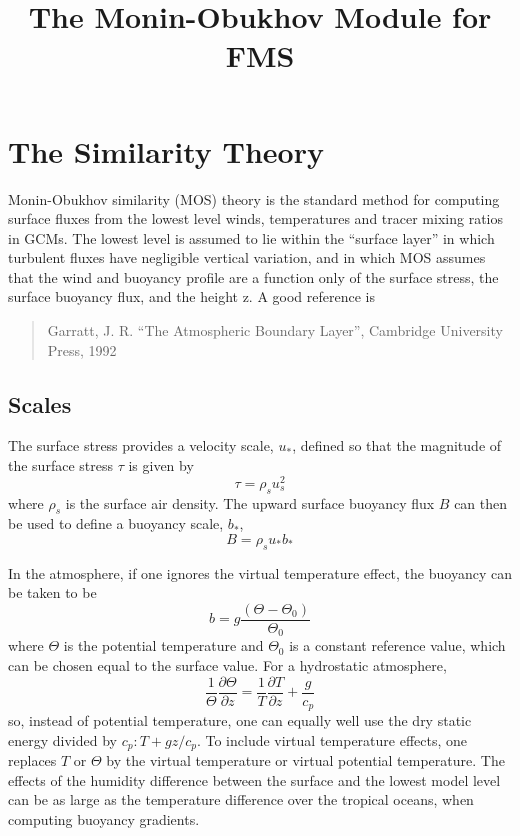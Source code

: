 \documentclass[12pt, letterpaper]{article}
\title{The Monin-Obukhov Module for FMS}
\date{}
\author{}
\begin{document}
\maketitle

\section{The Similarity Theory}

Monin-Obukhov similarity (MOS) theory is the standard method for
computing surface fluxes from the lowest level winds, temperatures and
tracer mixing ratios in GCMs.  The lowest level is assumed to lie
within the ``surface layer'' in which turbulent fluxes have negligible
vertical variation, and in which MOS assumes that the wind and
buoyancy profile are a function only of the surface stress, the
surface buoyancy flux, and the height z.  A good reference is
\begin{quote}
Garratt, J. R. ``The Atmospheric Boundary Layer'', Cambridge University Press, 1992
\end{quote}

\subsection{Scales}

The surface stress provides a velocity scale, $u_*$, defined so that
the magnitude of the surface stress $\tau$ is given by
\begin{equation}
  \tau = \rho_s u_s^2
\end{equation}
where $\rho_s$ is the surface air density.  The upward surface
buoyancy flux $B$ can then be used to define a buoyancy scale, $b_*$,
\begin{equation}
  B = \rho_s u_* b_*
\end{equation}

In the atmosphere, if one ignores the virtual temperature effect, the
buoyancy can be taken to be
\begin{equation}
  b = g \frac{(\Theta - \Theta_0)}{\Theta_0}
\end{equation}
where $\Theta$ is the potential temperature and $\Theta_0$ is a
constant reference value, which can be chosen equal to the surface
value.  For a hydrostatic atmosphere,
\begin{equation}
  \frac{1}{\Theta} \frac{\partial \Theta}{\partial z} = \frac{1}{T} \frac{\partial T}{\partial z} + \frac{g}{c_p}
\end{equation}
so, instead of potential temperature, one can equally well use the dry
static energy divided by $c_p: T + g z/c_p$.  To include virtual
temperature effects, one replaces $T$ or $\Theta$ by the virtual
temperature or virtual potential temperature.  The effects of the
humidity difference between the surface and the lowest model level can
be as large as the temperature difference over the tropical oceans,
when computing buoyancy gradients.
\end{document}
